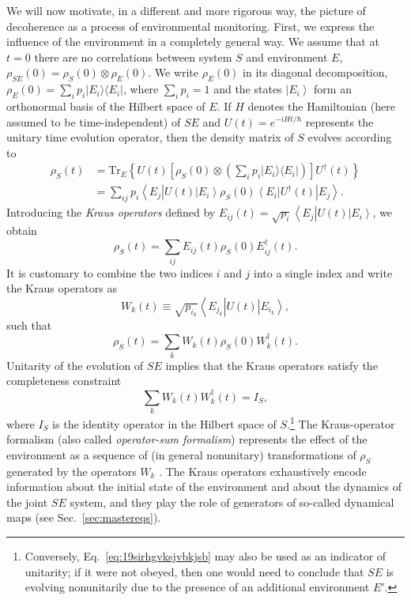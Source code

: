\documentclass[3p,sort&compress,12pt]{elsarticle}
\newcommand{\bra}[1]{\left\langle{#1}\right\vert}
\newcommand{\ket}[1]{\left\vert{#1}\right\rangle}
\newcommand{\ketbra}[2]{\ensuremath{|{#1 \rangle}{\langle #2}|}}
\newcommand{\E}{\ensuremath{e}}
\newcommand{\I}{\ensuremath{i}}
\newcommand{\op}[1]{#1}
\begin{document}
We will now motivate, in a different and more rigorous way, the picture of decoherence as a process of environmental monitoring. First, we express the influence of the environment in a completely general way. We assume that at $t=0$ there are no correlations between system $S$ and environment $E$, $\op{\rho}_{SE}(0) = \op{\rho}_S(0) \otimes \op{\rho}_E(0)$. We write $\op{\rho}_E(0)$ in its diagonal decomposition, $\op{\rho}_E(0) = \sum_i p_i \ketbra{E_i}{E_i}$, where $\sum_i p_i =1$ and the states $\ket{E_i}$ form an orthonormal basis of the Hilbert space of $E$. If $H$ denotes the Hamiltonian (here assumed to be time-independent) of $SE$ and $U(t) = \E^{-\I H t/\hbar}$ represents the unitary time evolution operator, then the density matrix of $S$ evolves according to 
%
\begin{align}
  \label{eq:1slvjhvkjfkjvsj0}
  \op{\rho}_S(t) &= \text{Tr}_E \left\{ U(t) \left[ \op{\rho}_S(0) \otimes \left( \sum_i p_i \ketbra{E_i}{E_i} \right) \right] U^\dagger(t) \right\}\nonumber \\
&= \sum_{ij} p_i \bra{E_j} U(t) \ket{E_i} \op{\rho}_S(0)\bra{E_i} U^\dagger(t) \ket{E_j}.
\end{align}
%
Introducing the \emph{Kraus operators} \cite{Kraus:1971:ii,Kraus:1983:ee} defined by $E_{ij}(t) = \sqrt{p_i} \bra{E_j} U(t) \ket{E_i}$, we obtain
%
\begin{equation}
 \op{\rho}_S(t) = \sum_{ij} E_{ij}(t) \op{\rho}_S(0) E^\dagger_{ij}(t).
\end{equation}
%
It is customary to combine the two indices $i$ and $j$ into a single index and write the Kraus operators as
%
\begin{equation}
  \label{eq:worihfvsjvttrafs2}
  W_k(t) \equiv \sqrt{p_{i_k}} \bra{E_{j_k}} U(t) \ket{E_{i_k}},
\end{equation}
%
such that 
%
\begin{equation}
\label{eq:dfjsb1}
 \op{\rho}_S(t) = \sum_k W_k(t) \op{\rho}_S(0) W^\dagger_k(t).
\end{equation}
%
Unitarity of the evolution of $SE$ implies that the Kraus operators satisfy the completeness constraint
%
\begin{equation}
  \label{eq:19sirhgvksjvbkjsb}
\sum_k W_k(t) W^\dagger_k(t) = I_S,
\end{equation}
%
where $I_S$ is the identity operator in the Hilbert space of $S$.\footnote{Conversely, Eq.~\eqref{eq:19sirhgvksjvbkjsb} may also be used as an indicator of unitarity; if it were not obeyed, then one would need to conclude that $SE$ is evolving nonunitarily due to the presence of an additional environment $E'$.} The Kraus-operator formalism (also called \emph{operator-sum formalism}) represents the effect of the environment as a sequence of (in general nonunitary) transformations of $\op{\rho}_S$ generated by the operators $W_k$ \cite{Breuer:2002:oq,Alicki:2007:uu}. The Kraus operators exhaustively encode information about the initial state of the environment and about the dynamics of the joint $SE$ system, and they play the role of generators of so-called dynamical maps (see Sec.~\ref{sec:mastereqs}). 
\end{document}
